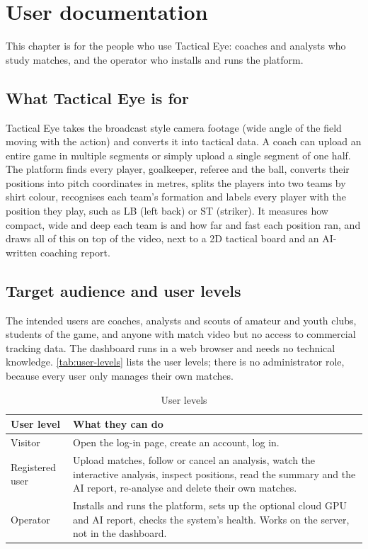 \chapter{User documentation}
\label{ch:user}

This chapter is for the people who use Tactical Eye: coaches and analysts who study matches, and the operator who installs and runs the platform.

\section{What Tactical Eye is for}

Tactical Eye takes the broadcast style camera footage (wide angle of the field moving with the action) and converts it into tactical data. A coach can upload an entire game in multiple segments or simply upload a single segment of one half. The platform finds every player, goalkeeper, referee and the ball, converts their positions into pitch coordinates in metres, splits the players into two teams by shirt colour, recognises each team's formation and labels every player with the position they play, such as LB (left back) or ST (striker). It measures how compact, wide and deep each team is and how far and fast each position ran, and draws all of this on top of the video, next to a 2D tactical board and an AI-written coaching report.

\section{Target audience and user levels}

The intended users are coaches, analysts and scouts of amateur and youth clubs, students of the game, and anyone with match video but no access to commercial tracking data. The dashboard runs in a web browser and needs no technical knowledge. \autoref{tab:user-levels} lists the user levels; there is no administrator role, because every user only manages their own matches.

\begin{table}[H]
	\centering
	\begin{tabular}{|p{}|p{}|}
		\hline
		\textbf{User level} & \textbf{What they can do} \\
		\hline
		Visitor & Open the log-in page, create an account, log in. \\
		\hline
		Registered user & Upload matches, follow or cancel an analysis, watch the interactive analysis, inspect positions, read the summary and the AI report, re-analyse and delete their own matches. \\
		\hline
		Operator & Installs and runs the platform, sets up the optional cloud GPU and AI report, checks the system's health. Works on the server, not in the dashboard. \\
		\hline
	\end{tabular}
	\caption{User levels}
	\label{tab:user-levels}
\end{table}

